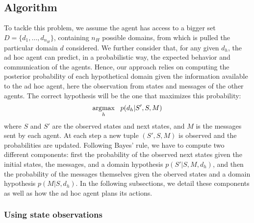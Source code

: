 \subsection{Algorithm}

To tackle this problem, we assume the agent has access to a bigger set $D = \{d_1, \ldots, d_{n_H}\}$, containing $n_H$ possible domains, from which is pulled the particular domain $d$ considered. We further consider that, for any given $d_h$, the ad hoc agent can predict, in a probabilistic way, the expected behavior and communication of the agents. Hence, our approach relies on computing the posterior probability of each hypothetical domain given the information available to the ad hoc agent, here the observation from states and messages of the other agents. The correct hypothesis will be the one that maximizes this probability:
%
\begin{eqnarray}
\operatorname*{\arg\!\max}_h~~p(d_h|S',S,M)  \label{eq:problem}
\end{eqnarray}
%
where $S$ and $S'$ are the observed states and next states, and $M$ is the messages sent by each agent. At each step a new tuple $(S', S, M)$ is observed and the probabilities are updated. Following Bayes' rule, we have to compute two different components: first the probability of the observed next states given the initial states, the messages, and a domain hypothesis $p(S'|S,M,d_h)$, and then the probability of the messages themselves given the oberved states and a domain hypothesis $p(M|S,d_h)$. In the following subsections, we detail these components as well as how the ad hoc agent plans its actions.%

\subsubsection{Using state observations}

